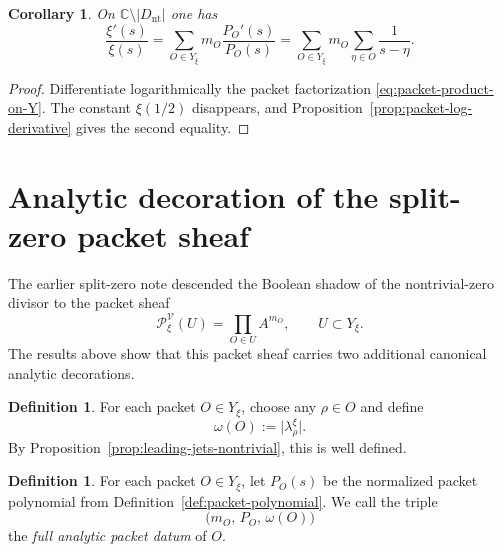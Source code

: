 \documentclass[11pt,a4paper]{article}
\numberwithin{equation}{section}
\newtheorem{corollary}[theorem]{Corollary}
\theoremstyle{definition}
\newtheorem{definition}[theorem]{Definition}
\theoremstyle{remark}
\newcommand{\CC}{\mathbb C}
\newcommand{\cV}{\mathcal V}
\begin{document}
\begin{corollary}\label{cor:xi-log-derivative-packet}
On $\CC\setminus |D_{\mathrm{nt}}|$ one has
\begin{equation}\label{eq:xi-log-derivative-packet}
\frac{\xi'(s)}{\xi(s)}=\sum_{O\in Y_\xi} m_O\frac{P_O'(s)}{P_O(s)}
=\sum_{O\in Y_\xi} m_O\sum_{\eta\in O}\frac{1}{s-\eta}.
\end{equation}
\end{corollary}

\begin{proof}
Differentiate logarithmically the packet factorization \eqref{eq:packet-product-on-Y}.  The constant $\xi(1/2)$ disappears, and Proposition~\ref{prop:packet-log-derivative} gives the second equality.
\end{proof}

\section{Analytic decoration of the split-zero packet sheaf}

The earlier split-zero note descended the Boolean shadow of the nontrivial-zero divisor to the packet sheaf
\[
\mathcal P_\xi^{\cV}(U)=\prod_{O\in U} A^{m_O},
\qquad U\subset Y_\xi.
\]
The results above show that this packet sheaf carries two additional canonical analytic decorations.

\begin{definition}
For each packet $O\in Y_\xi$, choose any $\rho\in O$ and define
\[
\omega(O):=\bigl|\lambda_\rho^{\xi}\bigr|.
\]
By Proposition~\ref{prop:leading-jets-nontrivial}, this is well defined.
\end{definition}

\begin{definition}
For each packet $O\in Y_\xi$, let $P_O(s)$ be the normalized packet polynomial from Definition~\ref{def:packet-polynomial}.  We call the triple
\begin{equation}\label{eq:analytic-packet-data}
\bigl(m_O,\,P_O,\,\omega(O)\bigr)
\end{equation}
the \emph{full analytic packet datum} of $O$.
\end{definition}
\end{document}
